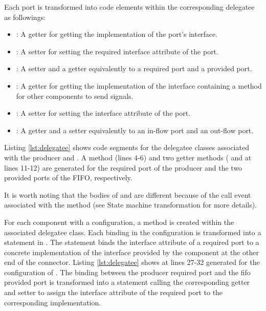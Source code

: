 \noindent
{}
Each port is transformed into code elements within the corresponding delegatee as followings:

\begin{itemize}[\footnotesize]
	\itemsep0em 
	\item {}: A getter for getting the implementation of the port's interface.
	
	\item {}: A setter for setting the  required interface attribute of the port.
	
	\item {}: A setter and a getter equivalently to a required port and a provided port.
	
	\item {}: A getter for getting the implementation of the interface containing a  method for other components to send signals.
	
	\item {}: A setter for setting the  interface attribute of the port.
	
	\item {}: A getter and a setter equivalently to an in-flow port and an out-flow port. 
\end{itemize}

Listing \ref{lst:delegatee} shows code segments for the delegatee classes associated with the producer and .
A  method (lines 4-6) and two getter methods ( and  at lines 11-12) are generated for the required port of the producer and the two provided ports of the FIFO, respectively.

It is worth noting that the bodies of  and  are different because of the  call event associated with the  method (see State machine transformation for more details).


\noindent
{}
For each component with a configuration, a  method is created within the associated delegatee class.
Each binding in the configuration is transformed into a statement in .
The statement binds the interface attribute of a required port to a concrete implementation of the interface provided by the component at the other end of the connector.
Listing \ref{lst:delegatee} shows  at lines 27-32 generated for the configuration of .
The binding between the  producer required port and the  fifo provided port is transformed into a statement calling the corresponding getter and setter to assign the interface attribute of the required port to the corresponding implementation. 






